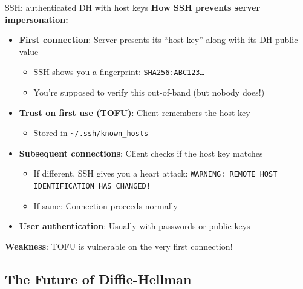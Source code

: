 \ifdefined\PRESENTATION\else\PassOptionsToClass{handout}{beamer}\fi\documentclass[aspectratio=169, lualatex]{beamer}
\begin{document}
\begin{frame}{SSH: authenticated DH with host keys}
	\textbf{How SSH prevents server impersonation:}
	\begin{itemize}[<+->]
		\item \textbf{First connection}: Server presents its ``host key'' along with its DH public value
		      \begin{itemize}
			      \item SSH shows you a fingerprint: \texttt{SHA256:ABC123\ldots}
			      \item You're supposed to verify this out-of-band (but nobody does!)
		      \end{itemize}
		\item \textbf{Trust on first use (TOFU)}: Client remembers the host key
		      \begin{itemize}
			      \item Stored in \texttt{\~{}/.ssh/known\_hosts}
		      \end{itemize}
		\item \textbf{Subsequent connections}: Client checks if the host key matches
		      \begin{itemize}
			      \item If different, SSH gives you a heart attack: \texttt{WARNING: REMOTE HOST IDENTIFICATION HAS CHANGED!}
			      \item If same: Connection proceeds normally
		      \end{itemize}
		\item \textbf{User authentication}: Usually with passwords or public keys
	\end{itemize}
	\textbf{Weakness}: TOFU is vulnerable on the very first connection!
\end{frame}

\subsection{The Future of Diffie-Hellman}
\end{document}
